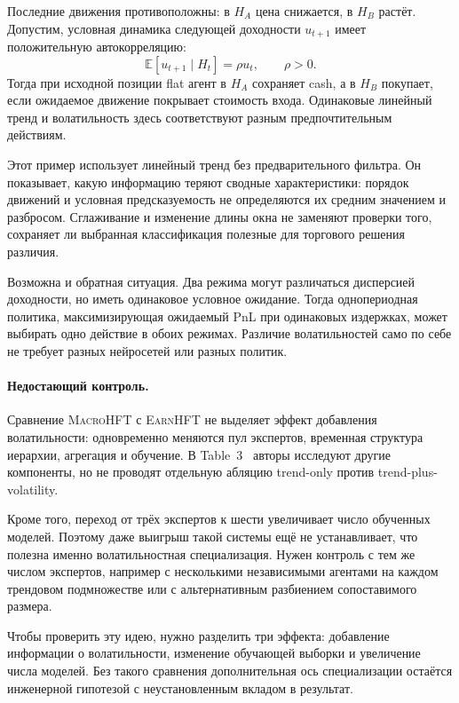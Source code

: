 \documentclass[9pt,a4paper,twocolumn]{extarticle}
\newcommand{\Exp}{\mathbb{E}}
\newcommand{\Macro}{\textsc{MacroHFT}}
\newcommand{\Earn}{\textsc{EarnHFT}}
\begin{document}
Последние движения противоположны: в $H_A$ цена снижается, в $H_B$ растёт. Допустим, условная
динамика следующей доходности $u_{t+1}$ имеет положительную автокорреляцию:
\begin{equation}
  \Exp[u_{t+1}\mid H_t]=\rho u_t,
  \qquad \rho>0.
  \label{eq:momentum_counterexample}
\end{equation}
Тогда при исходной позиции flat агент в $H_A$ сохраняет cash, а в $H_B$ покупает, если ожидаемое
движение покрывает стоимость входа. Одинаковые линейный тренд и волатильность здесь
соответствуют разным предпочтительным действиям.

Этот пример использует линейный тренд без предварительного фильтра. Он показывает, какую
информацию теряют сводные характеристики: порядок движений и условная предсказуемость не
определяются их средним значением и разбросом. Сглаживание и изменение длины окна не заменяют
проверки того, сохраняет ли выбранная классификация полезные для торгового решения различия.

Возможна и обратная ситуация. Два режима могут различаться дисперсией доходности, но иметь
одинаковое условное ожидание. Тогда однопериодная политика, максимизирующая ожидаемый PnL при
одинаковых издержках, может выбирать одно действие в обоих режимах. Различие волатильностей само
по себе не требует разных нейросетей или разных политик.

\paragraph{Недостающий контроль.}

Сравнение \Macro{} с \Earn{} не выделяет эффект добавления волатильности: одновременно меняются
пул экспертов, временная структура иерархии, агрегация и обучение. В
Table~3~\cite{zong2024macrohft} авторы исследуют другие компоненты, но не проводят отдельную
абляцию trend-only против trend-plus-volatility.

Кроме того, переход от трёх экспертов к шести увеличивает число обученных моделей. Поэтому даже
выигрыш такой системы ещё не устанавливает, что полезна именно волатильностная специализация.
Нужен контроль с тем же числом экспертов, например с несколькими независимыми агентами на каждом
трендовом подмножестве или с альтернативным разбиением сопоставимого размера.

Чтобы проверить эту идею, нужно разделить три эффекта: добавление информации о волатильности,
изменение обучающей выборки и увеличение числа моделей. Без такого сравнения дополнительная ось
специализации остаётся инженерной гипотезой с неустановленным вкладом в результат.
\end{document}
